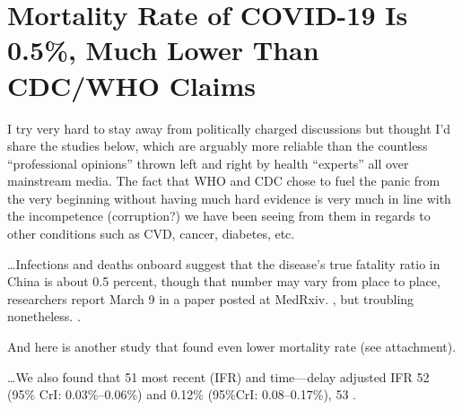 \chapter{Mortality Rate of COVID-19 Is 0.5\%, Much Lower Than CDC/WHO Claims}

\begin{refsection}

I try very hard to stay away from politically charged discussions but thought I'd share the studies below, which are arguably more reliable than the countless \enquote{professional opinions} thrown left and right by health \enquote{experts} all over mainstream media. The fact that WHO and CDC chose to fuel the panic from the very beginning without having much hard evidence is very much in line with the incompetence (corruption?) we have been seeing from them in regards to other conditions such as CVD, cancer, diabetes, etc.\textsuperscript{\cite{url09fe0bbf}}

\begin{tcolorbox}[quote]

\dots{}Infections and deaths onboard suggest that the disease's true fatality ratio in China is about 0.5 percent,\textsuperscript{\cite{url09fe0bbf}} though that number may vary from place to place, researchers report March 9 in a paper posted at MedRxiv. , but troubling nonetheless. .\textsuperscript{\cite{url9188f03b}}

\end{tcolorbox}

And here is another study that found even lower mortality rate (see attachment).

\begin{tcolorbox}[quote]

\dots{}We also found that 51 most recent  (IFR) and time---delay adjusted IFR  52  (95\% CrI: 0.03\%--0.06\%) and 0.12\% (95\%CrI: 0.08--0.17\%),  53 .\textsuperscript{\cite{url9188f03b}}


\end{tcolorbox}
\end{refsection}
